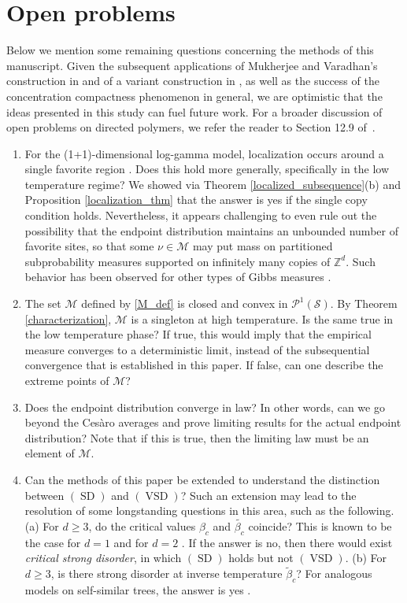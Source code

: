 \documentclass[11pt,reqno]{amsart}
\numberwithin{equation}{section}
\theoremstyle{definition}
\begin{document}
\section{Open problems}
Below we mention some remaining questions concerning the methods of this manuscript.
Given the subsequent applications \cite{koenig-mukherjee15,bolthausen-koenig-mukherjee15} of Mukherjee and Varadhan's construction in \cite{mukherjee-varadhan14} and of a variant construction in \cite{mukherjee15}, as well as the success of the concentration compactness phenomenon in general, we are optimistic that the ideas presented in this study can fuel future work.
For a broader discussion of  open problems on directed polymers, we refer the reader to Section 12.9 of~\cite{denHollander09}.
\begin{enumerate}
\item For the (1+1)-dimensional log-gamma model, localization occurs around a single favorite region \cite{comets-nguyen15}. Does this hold more generally, specifically in the low temperature regime? 
We showed via Theorem \ref{localized_subsequence}(b) and Proposition \ref{localization_thm} that the answer is yes if the single copy condition holds.
Nevertheless, it appears challenging to even rule out the possibility that the endpoint distribution maintains an unbounded number of favorite sites, so that some $\nu \in {\mathcal{M}}$ may put mass on partitioned subprobability measures supported on infinitely many copies of ${\mathbb{Z}}^d$. Such behavior has been observed for other types of Gibbs measures \cite{comets-dembo01}.
\item The set ${\mathcal{M}}$ defined by \eqref{M_def} is closed and convex in ${\mathcal{P}}^1({\mathcal{S}})$.
By Theorem \ref{characterization}, ${\mathcal{M}}$ is a singleton at high temperature.  
Is the same true in the low temperature phase?  If true, this would imply that the empirical measure converges to a deterministic limit, instead of the subsequential convergence that is established in this paper.
If false, can one describe the extreme points of ${\mathcal{M}}$?
\item Does the endpoint distribution converge in law? In other words, can we go beyond the Ces\`aro averages and prove limiting results for the actual endpoint distribution? Note that if this is true, then the limiting law must be an element of ${\mathcal{M}}$.
\item Can the methods of this paper be extended to understand the distinction between $(\operatorname{SD})$ and $(\operatorname{VSD})$? Such an extension may lead to the resolution of some longstanding questions in this area, such as the following. (a) For $d \geq 3$, do the critical values $\beta_c$ and ${\widetilde{{\beta_c}}}$ coincide?
This is known to be the case for $d = 1$ \cite{comets-vargas06} and for $d = 2$ \cite{lacoin10}.
If the answer is no, then there would exist \textit{critical strong disorder}, in which $(\operatorname{SD})$ holds but not $(\operatorname{VSD})$. (b) For $d \geq 3$, is there strong disorder at inverse temperature ${\widetilde{{\beta}}}_c$?
For analogous models on self-similar trees, the answer is yes \cite{kahane-peyriere76}.
\end{enumerate}
\end{document}

